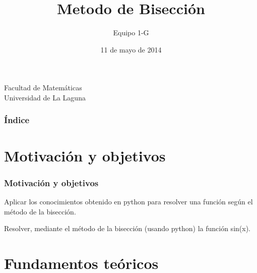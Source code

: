 \documentclass{beamer}
\title[Método de Bisección]{Metodo de Bisección}
\author[Equipo 1 G]{Equipo 1-G}
\date[11-05-2014]{11 de mayo de 2014}
\begin{document}
  
\begin{frame}

  \begin{small}
    \begin{center}
     Facultad de Matemáticas \\
     Universidad de La Laguna
    \end{center}
  \end{small}

\end{frame}

\begin{frame}
  \frametitle{Índice}  
  \tableofcontents[pausesections]
\end{frame}


\section{Motivación y objetivos}


\begin{frame}

\frametitle{Motivación y objetivos}

\begin{Motivation}
    Aplicar los conocimientos obtenido en python para resolver una función según el método de la bisección.
\end{Motivation}

\begin{Objetivos}
     Resolver, mediante el método de la bisección (usando python) la función sin(x).
\end{Objetivos}

\end{frame}

\section{Fundamentos teóricos}
\end{document}
